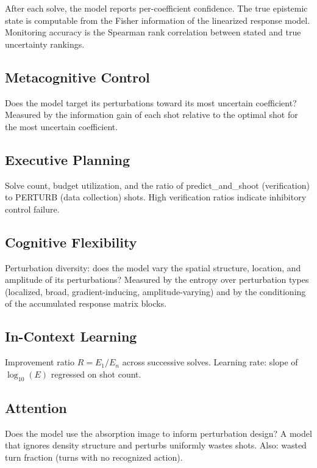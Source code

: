 \documentclass[11pt]{article}
\begin{document}
After each solve, the model reports per-coefficient confidence. The true epistemic state is computable from the Fisher information of the linearized response model. Monitoring accuracy is the Spearman rank correlation between stated and true uncertainty rankings.

\subsection{Metacognitive Control}

Does the model target its perturbations toward its most uncertain coefficient? Measured by the information gain of each shot relative to the optimal shot for the most uncertain coefficient.

\subsection{Executive Planning}

Solve count, budget utilization, and the ratio of predict\_and\_shoot (verification) to PERTURB (data collection) shots. High verification ratios indicate inhibitory control failure.

\subsection{Cognitive Flexibility}

Perturbation diversity: does the model vary the spatial structure, location, and amplitude of its perturbations? Measured by the entropy over perturbation types (localized, broad, gradient-inducing, amplitude-varying) and by the conditioning of the accumulated response matrix blocks.

\subsection{In-Context Learning}

Improvement ratio $R = E_1/E_n$ across successive solves. Learning rate: slope of $\log_{10}(E)$ regressed on shot count.

\subsection{Attention}

Does the model use the absorption image to inform perturbation design? A model that ignores density structure and perturbs uniformly wastes shots. Also: wasted turn fraction (turns with no recognized action).
\end{document}
